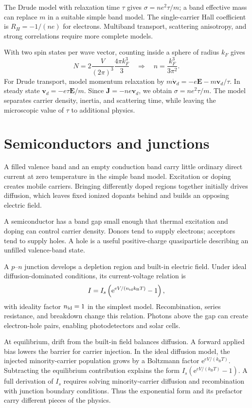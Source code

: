 \documentclass[11pt,oneside]{book}
\newcommand{\ee}{\mathrm{e}}
\newcommand{\vect}[1]{\boldsymbol{#1}}
\newcommand{\kb}{k_{\mathrm B}}
\theoremstyle{reviewstyle}
\begin{document}
The Drude model with relaxation time $\tau$ gives $\sigma=ne^2\tau/m$; a band effective mass can replace $m$ in a suitable simple band model. The single-carrier Hall coefficient is $R_H=-1/(ne)$ for electrons. Multiband transport, scattering anisotropy, and strong correlations require more complete models.

With two spin states per wave vector, counting inside a sphere of radius $k_F$ gives
\begin{equation}
N=2\frac{V}{(2\pi)^3}\frac{4\pi k_F^3}{3}
\quad\Longrightarrow\quad n=\frac{k_F^3}{3\pi^2}.
\end{equation}
For Drude transport, model momentum relaxation by $m\dot{\vect v}_d=-e\vect E-m\vect v_d/\tau$. In steady state $\vect v_d=-e\tau\vect E/m$. Since $\vect J=-ne\vect v_d$, we obtain $\sigma=ne^2\tau/m$. The model separates carrier density, inertia, and scattering time, while leaving the microscopic value of $\tau$ to additional physics.

\section{Semiconductors and junctions}
A filled valence band and an empty conduction band carry little ordinary direct current at zero temperature in the simple band model. Excitation or doping creates mobile carriers. Bringing differently doped regions together initially drives diffusion, which leaves fixed ionized dopants behind and builds an opposing electric field.

A semiconductor has a band gap small enough that thermal excitation and doping can control carrier density. Donors tend to supply electrons; acceptors tend to supply holes. A hole is a useful positive-charge quasiparticle describing an unfilled valence-band state.

A $p$--$n$ junction develops a depletion region and built-in electric field. Under ideal diffusion-dominated conditions, its current-voltage relation is
\begin{equation}I=I_s\left(\ee^{eV/(n_{\rm id}\kb T)}-1\right),\end{equation}
with ideality factor $n_{\rm id}=1$ in the simplest model. Recombination, series resistance, and breakdown change this relation. Photons above the gap can create electron-hole pairs, enabling photodetectors and solar cells.

At equilibrium, drift from the built-in field balances diffusion. A forward applied bias lowers the barrier for carrier injection. In the ideal diffusion model, the injected minority-carrier population grows by a Boltzmann factor $\ee^{eV/(\kb T)}$. Subtracting the equilibrium contribution explains the form $I_s(\ee^{eV/(\kb T)}-1)$. A full derivation of $I_s$ requires solving minority-carrier diffusion and recombination with junction boundary conditions. Thus the exponential form and its prefactor carry different pieces of the physics.
\end{document}
